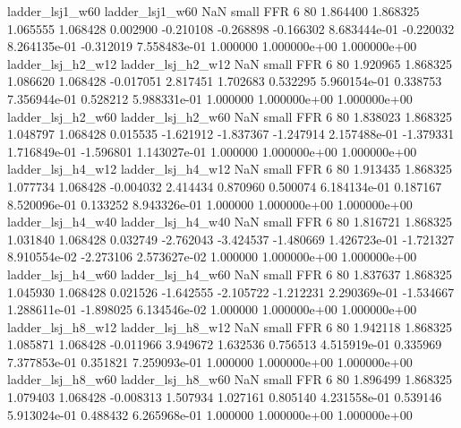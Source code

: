          ladder_lsj1_w60          ladder_lsj1_w60                   NaN      small      FFR                 6 80 1.864400       1.868325 1.065555       1.068428    0.002900     -0.210108     -0.268898    -0.166302   8.683444e-01 -0.220032 8.264135e-01    -0.312019   7.558483e-01            1.000000    1.000000e+00        1.000000e+00
       ladder_lsj_h2_w12        ladder_lsj_h2_w12                   NaN      small      FFR                 6 80 1.920965       1.868325 1.086620       1.068428   -0.017051      2.817451      1.702683     0.532295   5.960154e-01  0.338753 7.356944e-01     0.528212   5.988331e-01            1.000000    1.000000e+00        1.000000e+00
       ladder_lsj_h2_w60        ladder_lsj_h2_w60                   NaN      small      FFR                 6 80 1.838023       1.868325 1.048797       1.068428    0.015535     -1.621912     -1.837367    -1.247914   2.157488e-01 -1.379331 1.716849e-01    -1.596801   1.143027e-01            1.000000    1.000000e+00        1.000000e+00
       ladder_lsj_h4_w12        ladder_lsj_h4_w12                   NaN      small      FFR                 6 80 1.913435       1.868325 1.077734       1.068428   -0.004032      2.414434      0.870960     0.500074   6.184134e-01  0.187167 8.520096e-01     0.133252   8.943326e-01            1.000000    1.000000e+00        1.000000e+00
       ladder_lsj_h4_w40        ladder_lsj_h4_w40                   NaN      small      FFR                 6 80 1.816721       1.868325 1.031840       1.068428    0.032749     -2.762043     -3.424537    -1.480669   1.426723e-01 -1.721327 8.910554e-02    -2.273106   2.573627e-02            1.000000    1.000000e+00        1.000000e+00
       ladder_lsj_h4_w60        ladder_lsj_h4_w60                   NaN      small      FFR                 6 80 1.837637       1.868325 1.045930       1.068428    0.021526     -1.642555     -2.105722    -1.212231   2.290369e-01 -1.534667 1.288611e-01    -1.898025   6.134546e-02            1.000000    1.000000e+00        1.000000e+00
       ladder_lsj_h8_w12        ladder_lsj_h8_w12                   NaN      small      FFR                 6 80 1.942118       1.868325 1.085871       1.068428   -0.011966      3.949672      1.632536     0.756513   4.515919e-01  0.335969 7.377853e-01     0.351821   7.259093e-01            1.000000    1.000000e+00        1.000000e+00
       ladder_lsj_h8_w60        ladder_lsj_h8_w60                   NaN      small      FFR                 6 80 1.896499       1.868325 1.079403       1.068428   -0.008313      1.507934      1.027161     0.805140   4.231558e-01  0.539146 5.913024e-01     0.488432   6.265968e-01            1.000000    1.000000e+00        1.000000e+00
